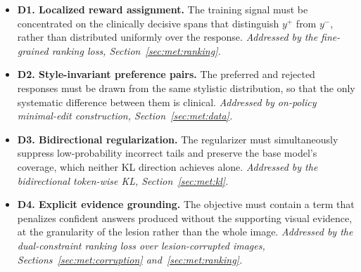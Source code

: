 \begin{itemize}
    \item \textbf{D1. Localized reward assignment.} The training signal must be concentrated on the clinically decisive spans that distinguish $y^+$ from $y^-$, rather than distributed uniformly over the response. \emph{Addressed by the fine-grained ranking loss, Section~\ref{sec:met:ranking}.}

    \item \textbf{D2. Style-invariant preference pairs.} The preferred and rejected responses must be drawn from the same stylistic distribution, so that the only systematic difference between them is clinical. \emph{Addressed by on-policy minimal-edit construction, Section~\ref{sec:met:data}.}

    \item \textbf{D3. Bidirectional regularization.} The regularizer must simultaneously suppress low-probability incorrect tails and preserve the base model's coverage, which neither KL direction achieves alone. \emph{Addressed by the bidirectional token-wise KL, Section~\ref{sec:met:kl}.}

    \item \textbf{D4. Explicit evidence grounding.} The objective must contain a term that penalizes confident answers produced without the supporting visual evidence, at the granularity of the lesion rather than the whole image. \emph{Addressed by the dual-constraint ranking loss over lesion-corrupted images, Sections~\ref{sec:met:corruption} and~\ref{sec:met:ranking}.}
\end{itemize}
